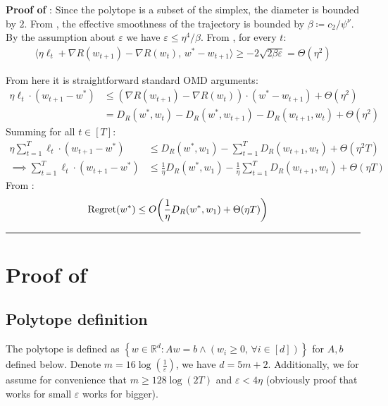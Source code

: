 \documentclass[10pt]{article}
\theoremstyle{definition}
\theoremstyle{remark}
\renewcommand{\epsilon}{\varepsilon}
\newcommand{\rr}{\mathbb{R}}
\newcommand\inprod[2]{\langle #1,\,#2 \rangle}
\newcommand{\curly}[1]{ {\left\{ #1 \right\}}}
\newcommand{\roundy}[1]{ {\left( #1 \right)}}
\newcommand{\barconst}{\nu}
\newcommand{\reg}{{\rm Regret}}
\begin{document}
\textbf{Proof of }: 
Since the polytope is a subset of the simplex, the diameter is bounded by $2$. From , the effective smoothness of the trajectory is bounded by $\beta \coloneqq c_2/\psi^\barconst$. By the assumption about $\epsilon$ we have $\epsilon \le \eta^4/\beta$. From , for every $t$:
\begin{align*}
    \inprod{\eta\ell_t + \nabla R(w_{t+1}) - \nabla R(w_t)}{w^* - w_{t+1}} \ge -2\sqrt{2\beta\epsilon} = \Theta\roundy{\eta^2}
\end{align*}

From here it is straightforward standard OMD arguments:
\begin{align*}
\eta \ell_t \cdot (w_{t+1}-w^*) 
&\leq (\nabla R(w_{t+1}) - \nabla R(w_{t})) \cdot (w^*-w_{t+1}) + \Theta\roundy{\eta^2}
\\
&=
D_R(w^*,w_t) - D_R(w^*,w_{t+1}) - D_R(w_{t+1},w_t) + \Theta\roundy{\eta^2} 
\end{align*}
Summing for all $t\in[T]$:
\begin{align*}
    \eta\sum_{t=1}^T \ell_t \cdot (w_{t+1}-w^*)
&\leq D_R(w^*,w_1) - \sum_{t=1}^T D_R(w_{t+1},w_t) + \Theta\roundy{\eta^2 T}\\
\implies \sum_{t=1}^T \ell_t \cdot (w_{t+1}-w^*) &\le \frac1\eta D_R(w^*,w_1) - \frac1\eta \sum_{t=1}^T D_R(w_{t+1},w_t) + \Theta\roundy{\eta T}
\end{align*}
From :
\begin{align*}
    \reg(w^*) &\le O\roundy{\frac{1}{\eta}D_R(w^*, w_1) + \Theta\roundy{\eta T}}
\end{align*} 

\hfill\rule{2mm}{2mm}

\section{Proof of }\label{sec:polytope lower bound}
\subsection{Polytope definition}
The polytope is defined as $\curly{w \in \rr^d: Aw=b\land \roundy{w_i\ge 0,\,\forall i\in[d]}}$ for $A,b$ defined below. Denote $m=16\log\roundy{\frac{1}{\epsilon}}$, we have $d=5m+2$. Additionally, we for assume for convenience that $m \ge 128\log(2T)$ and $\epsilon < 4\eta$ (obviously proof that works for small $\epsilon$ works for bigger).
\end{document}
